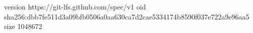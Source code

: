 version https://git-lfs.github.com/spec/v1
oid sha256:dbb7fe511d3a09bfb0506a0aa630ca7d2cae5334174b8590f037e722a9e96aa5
size 1048672
